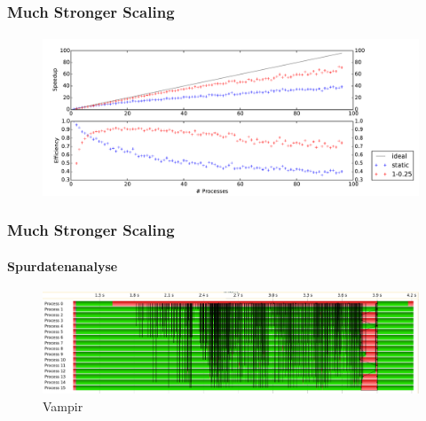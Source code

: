 \begin{frame}
    \frametitle{Much Stronger Scaling}
    \framesubtitle{{}}

    \begin{figure}
        \centering
        \centering
        \includegraphics[width=\textwidth]{content/img/strong_scaling_time_final}
    \end{figure}

\end{frame}

\begin{frame}
    \frametitle{Much Stronger Scaling}
    \framesubtitle{Spurdatenanalyse}

    \begin{figure}
        \centering
        \includegraphics[width=\textwidth]{content/img/vampir_dynamic}
        \caption{Vampir}
    \end{figure}

\end{frame}

